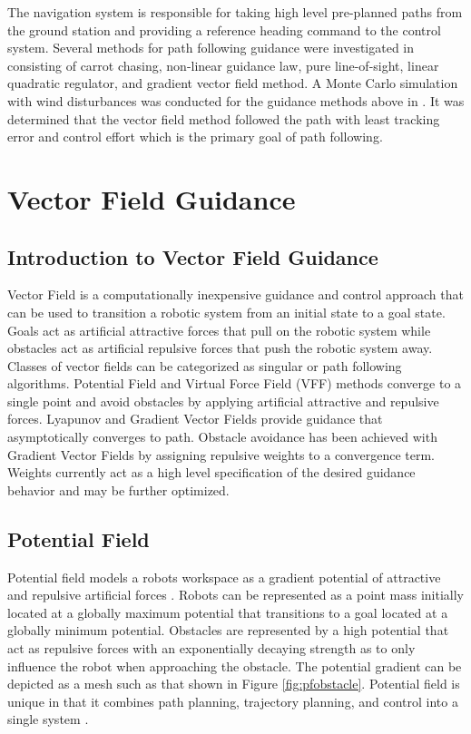 \documentclass[numbered,pdftex]{ohio-etd}
\begin{document}
The navigation system is responsible for taking high level pre-planned paths from the ground station and providing a reference heading command to the control system. Several methods for path following guidance were investigated in \cite{sujit_unmanned_2014} consisting of carrot chasing, non-linear guidance law, pure line-of-sight, linear quadratic regulator, and gradient vector field method. A Monte Carlo simulation with wind disturbances was conducted for the guidance methods above in \cite{sujit_unmanned_2014}. It was determined that the vector field method followed the path with least tracking error and control effort which is the primary goal of path following. 


\section{Vector Field Guidance}
\subsection{Introduction to Vector Field Guidance}
 Vector Field is a computationally inexpensive guidance and control approach that can be used to transition a robotic system from an initial state to a goal state. Goals act as artificial attractive forces that pull on the robotic system while obstacles act as artificial repulsive forces that push the robotic system away. Classes of vector fields can be categorized as singular or path following algorithms. Potential Field and Virtual Force Field (VFF) methods converge to a single point and avoid obstacles by applying artificial attractive and repulsive forces. Lyapunov and Gradient Vector Fields provide guidance that asymptotically converges to path. Obstacle avoidance has been achieved with Gradient Vector Fields by assigning repulsive weights to a convergence term. Weights currently act as a high level specification of the desired guidance behavior and may be further optimized. 

\subsection{Potential Field}
Potential field models a robots workspace as a gradient potential of attractive and repulsive artificial forces \cite{khatib_real-time_1986}. Robots can be represented as a point mass initially located at a globally maximum potential that transitions to a goal located at a globally minimum potential. Obstacles are represented by a high potential that act as repulsive forces with an exponentially decaying strength as to only influence the robot when approaching the obstacle. The potential gradient can be depicted as a mesh such as that shown in Figure \ref{fig:pfobstacle}. Potential field is unique in that it combines path planning, trajectory planning, and control into a single system \cite{rimon_exact_1992}. 
\end{document}
